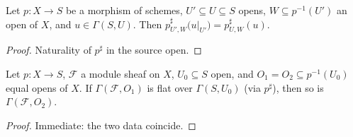 \begin{lemma}
  \leanok
  \label{lem:appLE_base_res_apply}
  Let \(p : X \to S\) be a morphism of schemes, \(U' \subseteq U \subseteq S\)
  opens, \(W \subseteq p^{-1}(U')\) an open of \(X\), and
  \(u \in \Gamma(S, U)\). Then
  \(p^\sharp_{U',W}\bigl(u|_{U'}\bigr) = p^\sharp_{U,W}(u)\).
\end{lemma}
\begin{proof}
  \leanok
  Naturality of \(p^\sharp\) in the source open.
\end{proof}

\begin{lemma}
  \leanok
  \label{lem:flat_sections_congr}
  Let \(p : X \to S\), \(\mathcal F\) a module sheaf on \(X\),
  \(U_0 \subseteq S\) open, and \(O_1 = O_2 \subseteq p^{-1}(U_0)\) equal
  opens of \(X\). If \(\Gamma(\mathcal F, O_1)\) is flat over
  \(\Gamma(S, U_0)\) (via \(p^\sharp\)), then so is
  \(\Gamma(\mathcal F, O_2)\).
\end{lemma}
\begin{proof}
  \leanok
  Immediate: the two data coincide.
\end{proof}

